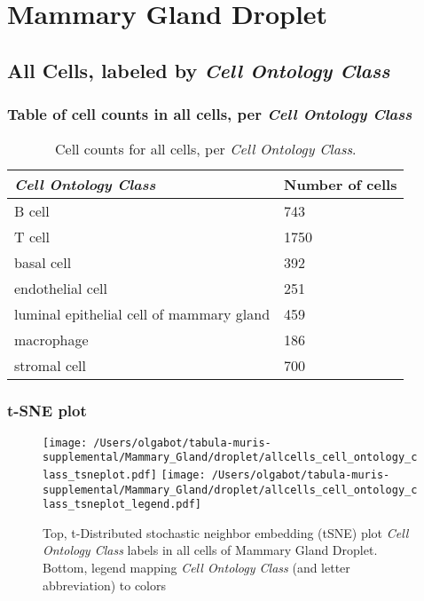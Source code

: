 \clearpage
\section{Mammary Gland Droplet}

\subsection{All Cells, labeled by \emph{Cell Ontology Class}}
\subsubsection{Table of cell counts in all cells, per \emph{Cell Ontology Class}}\begin{table}[h]
\centering
\label{my-label}
\begin{tabular}{@{}ll@{}}
\toprule

\emph{Cell Ontology Class}& Number of cells \\ \midrule
B cell & 743 \\

T cell & 1750 \\

basal cell & 392 \\

endothelial cell & 251 \\

luminal epithelial cell of mammary gland & 459 \\

macrophage & 186 \\

stromal cell & 700 \\
\bottomrule
\end{tabular}
\caption{Cell counts for all cells, per \emph{Cell Ontology Class}.}
\end{table}

\clearpage
\subsubsection{t-SNE plot}
\begin{figure}[h]
\centering
\texttt{[image: /Users/olgabot/tabula-muris-supplemental/Mammary\_Gland/droplet/allcells\_cell\_ontology\_class\_tsneplot.pdf]}
\texttt{[image: /Users/olgabot/tabula-muris-supplemental/Mammary\_Gland/droplet/allcells\_cell\_ontology\_class\_tsneplot\_legend.pdf]}
\caption{Top, t-Distributed stochastic neighbor embedding (tSNE) plot  \emph{Cell Ontology Class} labels in all cells of Mammary Gland Droplet. Bottom, legend mapping \emph{Cell Ontology Class} (and letter abbreviation) to colors}
\end{figure}


